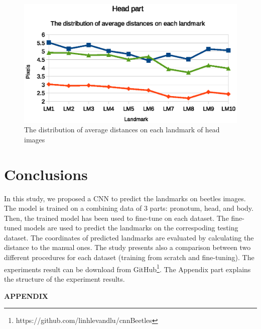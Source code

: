 \documentclass[12pt,a4paper]{article}
\begin{document}
\begin{figure}[h!]
	\centering
	\includegraphics[scale=1]{images/fine_tuning/head_part}
	\caption{The distribution of average distances on each landmark of head images}
	\label{fgh}
\end{figure}
\vspace{2cm}
\section{Conclusions}
In this study, we proposed a CNN to predict the landmarks on beetles images. The model is trained on a combining data of $3$ parts: pronotum, head, and body. Then, the trained model has been used to fine-tune on each dataset. The fine-tuned models are used to predict the landmarks on the correspoding testing dataset. The coordinates of predicted landmarks are evaluated by calculating the distance to the manual ones. The study presents also a comparison between two different procedures for each dataset (training from scratch and fine-tuning). The experiments result can be download from GitHub\footnote{https://github.com/linhlevandlu/cnnBeetles}. The Appendix part explains the structure of the experiment results.


\pagebreak
\appendix
\begin{center}
\textbf{\LARGE{APPENDIX}}
\end{center}
\end{document}
